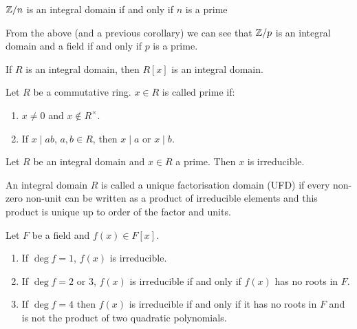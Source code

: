 \documentclass[10pt, a4paper]{article}
\begin{document}
\begin{lemma}
    $\mathbb{Z} / n$ is an integral domain if and only if $n$ is a prime
\end{lemma}

\vspace{0.5em}

\begin{remark}
    From the above
    (and a previous corollary)
    we can see that $\mathbb{Z} / p$ is an integral domain and a field if and only if $p$ is a prime.
\end{remark}

\vspace{1em}

\begin{proposition}
    If $R$ is an integral domain,
    then $R[x]$ is an integral domain.
\end{proposition}

\begin{definition}
    Let $R$ be a commutative ring.
    $x \in R$ is called prime if:
    \begin{enumerate}[label = (\roman*)]
        \item $x \neq 0$ and $x \notin R ^ {\times}$.

        \item If $x \mid ab$,
        $a, b \in R$,
        then $x \mid a$ or $x \mid b$.
    \end{enumerate}
\end{definition}

\begin{lemma}
    Let $R$ be an integral domain and $x \in R$ a prime.
    Then $x$ is irreducible.
\end{lemma}

\begin{definition}
    An integral domain $R$ is called a unique factorisation domain
    (UFD)
    if every non-zero non-unit can be written as a product of irreducible elements and this product is unique up to order of the factor and units.
\end{definition}

\begin{proposition}
    Let $F$ be a field and $f(x) \in F[x]$.

    \begin{enumerate}[label = (\roman*)]
        \item If $\deg{f} = 1$,
        $f(x)$ is irreducible.

        \item If $\deg{f} = 2$ or $3$,
        $f(x)$ is irreducible if and only if $f(x)$ has no roots in $F$.

        \item If $\deg{f} = 4$ then $f(x)$ is irreducible if and only if it has no roots in $F$ and is not the product of two quadratic polynomials.
    \end{enumerate}
\end{proposition}

\begin{proposition}
    
\end{proposition}
\end{document}
